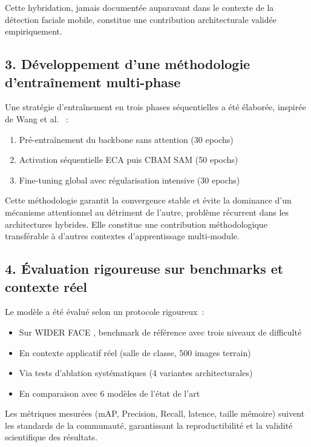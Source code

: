 \begin{onehalfspace}
\hspace{0.65 cm}Cette hybridation, jamais documentée auparavant dans le contexte de la détection faciale mobile, constitue une contribution architecturale validée empiriquement.

\subsection*{3. Développement d'une méthodologie d'entraînement multi-phase}

\hspace{0.65 cm}Une stratégie d'entraînement en trois phases séquentielles a été élaborée, inspirée de Wang et al. \cite{Wang2024ECACBAM}~:
\begin{enumerate}
\item Pré-entraînement du backbone sans attention (30 epochs)
\item Activation séquentielle ECA puis CBAM SAM (50 epochs)
\item Fine-tuning global avec régularisation intensive (30 epochs)
\end{enumerate}

\hspace{0.65 cm}Cette méthodologie garantit la convergence stable et évite la dominance d'un mécanisme attentionnel au détriment de l'autre, problème récurrent dans les architectures hybrides. Elle constitue une contribution méthodologique transférable à d'autres contextes d'apprentissage multi-module.

\subsection*{4. Évaluation rigoureuse sur benchmarks et contexte réel}

\hspace{0.65 cm}Le modèle a été évalué selon un protocole rigoureux~:
\begin{itemize}
\item Sur WIDER FACE \cite{Yang2016WIDERFACE}, benchmark de référence avec trois niveaux de difficulté
\item En contexte applicatif réel (salle de classe, 500 images terrain)
\item Via tests d'ablation systématiques (4 variantes architecturales)
\item En comparaison avec 6 modèles de l'état de l'art
\end{itemize}

\hspace{0.65 cm}Les métriques mesurées (mAP, Precision, Recall, latence, taille mémoire) suivent les standards de la communauté, garantissant la reproductibilité et la validité scientifique des résultats.


\end{onehalfspace}
